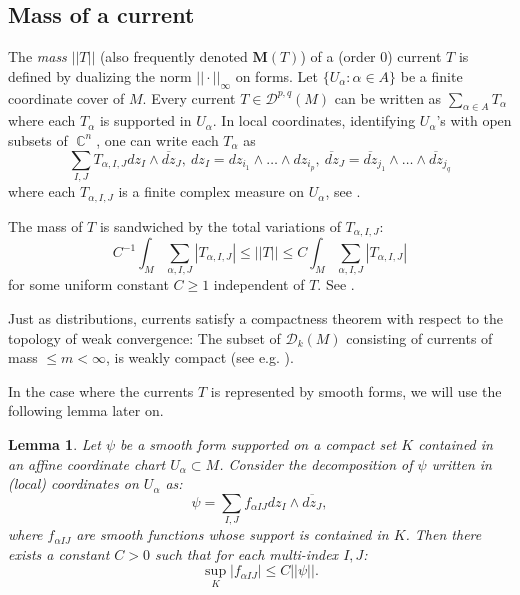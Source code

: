 \documentclass[12pt]{amsbook}%
\newtheorem{lem}[thm]{Lemma}
\theoremstyle{definition}
\theoremstyle{remark}
\numberwithin{section}{chapter}
\numberwithin{subsection}{section}
\numberwithin{figure}{chapter}
\DeclareMathOperator{\C}{\mathbb{C}}
\def\cD{{\mathscr{D}}}
\def\Om{\Omega}
\def\al{\alpha}
\def\ol{\overline}
\def\kap{}
\begin{document}
{{\subsection{Mass of a current} 

The {\em mass} $||T||$ (also frequently denoted ${\mathbf M}(T)$) of a (order $0$) current $T$ 
 is defined by dualizing the norm $||\cdot ||_{\infty}$ on forms. Let $\{U_\alpha: \alpha\in A\}$ be a finite coordinate cover of $M$. Every current { $T\in \cD^{p,q}(M)$} can be written as $\sum_{\alpha\in A} T_\alpha$ where each $T_\alpha$ is supported in $U_\alpha$. In local coordinates, identifying $U_\alpha$'s with open subsets of $\C^{n}$,  
one can write each $T_\alpha$ as
$$
\sum_{I,J} T_{\alpha,I,J} dz_I\wedge \ol{dz}_J, \ dz_I= dz_{i_1} \wedge \ldots \wedge  dz_{i_{p}}, \ 
 \ol{dz}_J= \ol{dz}_{j_1}\wedge \ldots \wedge  \ol{dz}_{j_{q}} 
$$
where each $T_{\alpha,I,J}$ is a finite complex measure on $U_\alpha$, see \cite[Ch I, Prop. 2.9]{demailly}. 


 
The mass of $T$ is sandwiched by the total variations of $T_{\alpha,I,J}$:
$$
C^{-1} \int_M \sum_{\alpha,I,J} |T_{\alpha,I,J}|\leqslant  ||T||\leqslant C \int_M \sum_{\alpha,I,J} |T_{\alpha,I,J}|
$$
for some uniform constant $C\geqslant 1$ independent of $T$. See 
\cite[Remark 1.15 p.134]{demailly}. 
  
Just as distributions, currents satisfy a compactness theorem with respect to the topology of weak convergence: 
The subset of $\cD_k(M)$ consisting of currents of mass $\leqslant m<\infty$, 
is weakly compact (see e.g. \cite[Lemma 26.13]{Simon}). 

In the case where the currents $T$ is represented by smooth forms, we will use the following lemma later on. 


\begin{lem} \label{lem_sup_coef} Let $\psi$ be a smooth form supported on a compact set $K $ contained in an affine coordinate chart $U_\alpha \subset M$. Consider  the decomposition of $\psi$ written in (local) coordinates on $U_\alpha$  as: 
\begin{equation*}
\psi = \sum_{I,J} f_{\alpha I J} dz_I \wedge \overline{dz_J}, 
\end{equation*}
where $f_{\alpha I J}$ are smooth  functions whose support is contained in $K$. Then there exists a constant $C> 0$ such that for each multi-index $I,J$: 
\begin{equation*}
\sup_{K } |f_{\alpha I J}| \leqslant C || \psi ||.
\end{equation*}
\end{lem}

}}
\end{document}
